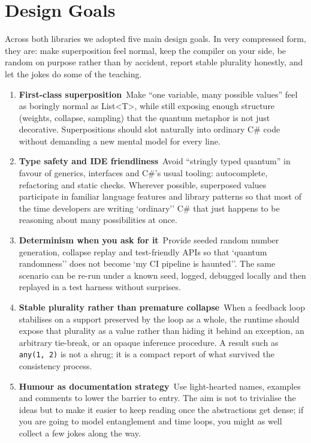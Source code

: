 \documentclass[a4paper,11pt]{article}
\begin{document}
\section{Design Goals}

Across both libraries we adopted five main design goals. In very compressed form,
they are: make superposition feel normal, keep the compiler on your side, be random
on purpose rather than by accident, report stable plurality honestly, and let the
jokes do some of the teaching.

\begin{enumerate}
\def\labelenumi{\arabic{enumi}.}

\item
\textbf{First-class superposition}\
Make ``one variable, many possible values'' feel as boringly normal as List\textless T\textgreater{}, while still exposing enough structure (weights, collapse, sampling) that the quantum metaphor is not just decorative. Superpositions should slot naturally into ordinary C\# code without demanding a new mental model for every line.

\item
\textbf{Type safety and IDE friendliness}\
Avoid ``stringly typed quantum'' in favour of generics, interfaces and C\#'s usual tooling: autocomplete, refactoring and static checks. Wherever possible, superposed values participate in familiar language features and library patterns so that most of the time developers are writing `ordinary'' C\# that just happens to be reasoning about many possibilities at once.

\item
\textbf{Determinism when you ask for it}\
Provide seeded random number generation, collapse replay and test-friendly APIs so that `quantum randomness'' does not become `my CI pipeline is haunted''. The same scenario can be re-run under a known seed, logged, debugged locally and then replayed in a test harness without surprises.~\parencite{Pau25}

\item
\textbf{Stable plurality rather than premature collapse}\
When a feedback loop stabilises on a support preserved by the loop as a whole,
the runtime should expose that plurality as a value rather than hiding it behind
an exception, an arbitrary tie-break, or an opaque inference procedure. A result
such as \texttt{any(1, 2)} is not a shrug; it is a compact report of what survived
the consistency process.

\item
\textbf{Humour as documentation strategy}\
Use light-hearted names, examples and comments to lower the barrier to entry. The aim is not to trivialise the ideas but to make it easier to keep reading once the abstractions get dense; if you are going to model entanglement and time loops, you might as well collect a few jokes along the way.

\end{enumerate}
\end{document}
